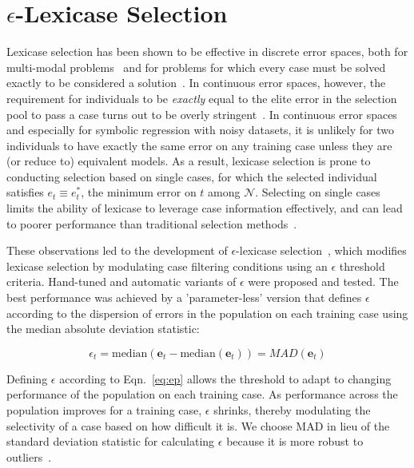 \documentclass[twoside]{article}
\begin{document}
\section{{\large $\epsilon$}-Lexicase Selection}\label{s:eplex}

Lexicase selection has been shown to be effective in discrete error spaces, both for multi-modal problems~\citep{spector_assessment_2012} and for problems for which every case must be solved exactly to be considered a solution~\citep{helmuth_solving_2014}. In continuous error spaces, however, the requirement for individuals to be {\it exactly} equal to the elite error in the selection pool to pass a case turns out to be overly stringent~\citep{la_cava_epsilon-lexicase_2016}. In continuous error spaces and especially for symbolic regression with noisy datasets, it is unlikely for two individuals to have exactly the same error on any training case unless they are (or reduce to) equivalent models. As a result, lexicase selection is prone to conducting selection based on single cases, for which the selected individual satisfies $e_t \equiv e^*_t$, the minimum error on $t$ among $\mathcal{N}$. Selecting on single cases limits the ability of lexicase to leverage case information effectively, and can lead to poorer performance than traditional selection methods~\citep{la_cava_epsilon-lexicase_2016}. 

These observations led to the development of $\epsilon$-lexicase selection~\citep{la_cava_epsilon-lexicase_2016}, which modifies lexicase selection by modulating case filtering conditions using an $\epsilon$ threshold criteria. Hand-tuned and automatic variants of $\epsilon$ were proposed and tested. The best performance was achieved by a 'parameter-less' version that defines $\epsilon$ according to the dispersion of errors in the population on each training case using the median absolute deviation statistic:  

\begin{equation}\label{eq:ep}
\epsilon_t = \text{median}(\mathbf{e}_t - \text{median}(\mathbf{e}_t)) = MAD(\mathbf{e}_t)
\end{equation}

Defining $\epsilon$ according to Eqn.~\ref{eq:ep} allows the threshold to adapt to changing performance of the population on each training case. As performance across the population improves for a training case, $\epsilon$ shrinks, thereby modulating the selectivity of a case based on how difficult it is. We choose MAD in lieu of the standard deviation statistic for calculating $\epsilon$ because it is more robust to outliers~\citep{pham-gia_mean_2001}. 
\end{document}
